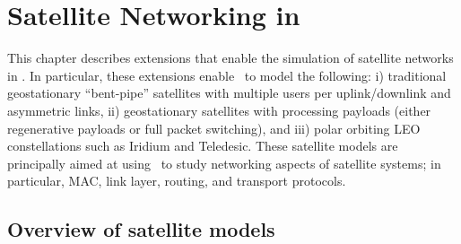 %
\chapter{Satellite Networking in \ns}
\label{chap:satellite}

This chapter describes extensions that enable the simulation of satellite
networks in \ns.  In particular, these extensions enable \ns~to model
the following:  i) traditional geostationary ``bent-pipe'' satellites with 
multiple users per uplink/downlink and asymmetric links, ii) geostationary 
satellites with processing payloads (either regenerative payloads or full 
packet switching), and iii) polar orbiting LEO constellations such as 
Iridium and Teledesic.  These satellite models are principally aimed at 
using \ns~to study networking aspects of satellite systems; in particular, 
MAC, link layer, routing, and transport protocols.  




\section{Overview of satellite models}
\label{sec:satellite/overview}


